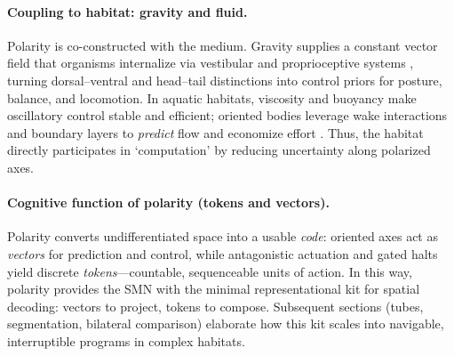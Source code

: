 \paragraph{Coupling to habitat: gravity and fluid.}
Polarity is co-constructed with the medium.
Gravity supplies a constant vector field that organisms internalize via vestibular and proprioceptive systems \cite{AngelakiCullen2008VestibularMultisensory}, turning dorsal--ventral and head--tail distinctions into control priors for posture, balance, and locomotion.
In aquatic habitats, viscosity and buoyancy make oscillatory control stable and efficient; oriented bodies leverage wake interactions and boundary layers to \emph{predict} flow and economize effort \cite{Vogel1994LifeInMovingFluids,Alexander2003PrinciplesLocomotion}.
Thus, the habitat directly participates in `computation' by reducing uncertainty along polarized axes.




\paragraph{Cognitive function of polarity (tokens and vectors).}
Polarity converts undifferentiated space into a usable \emph{code}: oriented axes act as \emph{vectors} for prediction and control, while antagonistic actuation and gated halts yield discrete \emph{tokens}—countable, sequenceable units of action. In this way, polarity provides the SMN with the minimal representational kit for spatial decoding: vectors to project, tokens to compose. Subsequent sections (tubes, segmentation, bilateral comparison) elaborate how this kit scales into navigable, interruptible programs in complex habitats.


